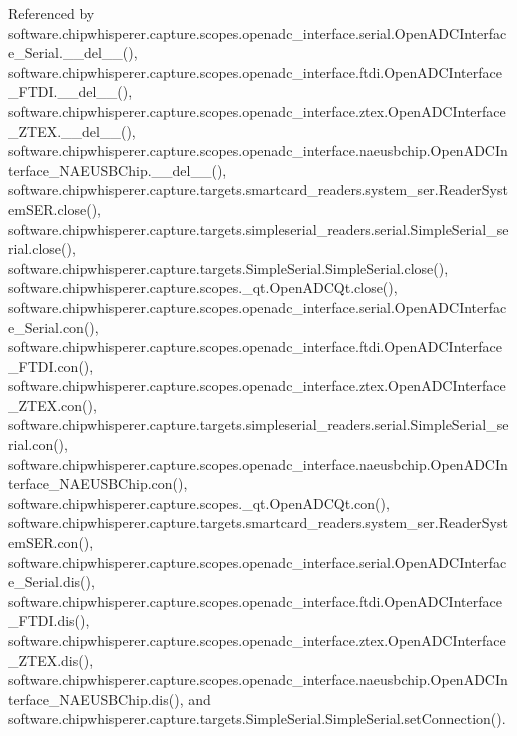 Referenced by software.\+chipwhisperer.\+capture.\+scopes.\+openadc\+\_\+interface.\+serial.\+Open\+A\+D\+C\+Interface\+\_\+\+Serial.\+\_\+\+\_\+del\+\_\+\+\_\+(), software.\+chipwhisperer.\+capture.\+scopes.\+openadc\+\_\+interface.\+ftdi.\+Open\+A\+D\+C\+Interface\+\_\+\+F\+T\+D\+I.\+\_\+\+\_\+del\+\_\+\+\_\+(), software.\+chipwhisperer.\+capture.\+scopes.\+openadc\+\_\+interface.\+ztex.\+Open\+A\+D\+C\+Interface\+\_\+\+Z\+T\+E\+X.\+\_\+\+\_\+del\+\_\+\+\_\+(), software.\+chipwhisperer.\+capture.\+scopes.\+openadc\+\_\+interface.\+naeusbchip.\+Open\+A\+D\+C\+Interface\+\_\+\+N\+A\+E\+U\+S\+B\+Chip.\+\_\+\+\_\+del\+\_\+\+\_\+(), software.\+chipwhisperer.\+capture.\+targets.\+smartcard\+\_\+readers.\+system\+\_\+ser.\+Reader\+System\+S\+E\+R.\+close(), software.\+chipwhisperer.\+capture.\+targets.\+simpleserial\+\_\+readers.\+serial.\+Simple\+Serial\+\_\+serial.\+close(), software.\+chipwhisperer.\+capture.\+targets.\+Simple\+Serial.\+Simple\+Serial.\+close(), software.\+chipwhisperer.\+capture.\+scopes.\+\_\+qt.\+Open\+A\+D\+C\+Qt.\+close(), software.\+chipwhisperer.\+capture.\+scopes.\+openadc\+\_\+interface.\+serial.\+Open\+A\+D\+C\+Interface\+\_\+\+Serial.\+con(), software.\+chipwhisperer.\+capture.\+scopes.\+openadc\+\_\+interface.\+ftdi.\+Open\+A\+D\+C\+Interface\+\_\+\+F\+T\+D\+I.\+con(), software.\+chipwhisperer.\+capture.\+scopes.\+openadc\+\_\+interface.\+ztex.\+Open\+A\+D\+C\+Interface\+\_\+\+Z\+T\+E\+X.\+con(), software.\+chipwhisperer.\+capture.\+targets.\+simpleserial\+\_\+readers.\+serial.\+Simple\+Serial\+\_\+serial.\+con(), software.\+chipwhisperer.\+capture.\+scopes.\+openadc\+\_\+interface.\+naeusbchip.\+Open\+A\+D\+C\+Interface\+\_\+\+N\+A\+E\+U\+S\+B\+Chip.\+con(), software.\+chipwhisperer.\+capture.\+scopes.\+\_\+qt.\+Open\+A\+D\+C\+Qt.\+con(), software.\+chipwhisperer.\+capture.\+targets.\+smartcard\+\_\+readers.\+system\+\_\+ser.\+Reader\+System\+S\+E\+R.\+con(), software.\+chipwhisperer.\+capture.\+scopes.\+openadc\+\_\+interface.\+serial.\+Open\+A\+D\+C\+Interface\+\_\+\+Serial.\+dis(), software.\+chipwhisperer.\+capture.\+scopes.\+openadc\+\_\+interface.\+ftdi.\+Open\+A\+D\+C\+Interface\+\_\+\+F\+T\+D\+I.\+dis(), software.\+chipwhisperer.\+capture.\+scopes.\+openadc\+\_\+interface.\+ztex.\+Open\+A\+D\+C\+Interface\+\_\+\+Z\+T\+E\+X.\+dis(), software.\+chipwhisperer.\+capture.\+scopes.\+openadc\+\_\+interface.\+naeusbchip.\+Open\+A\+D\+C\+Interface\+\_\+\+N\+A\+E\+U\+S\+B\+Chip.\+dis(), and software.\+chipwhisperer.\+capture.\+targets.\+Simple\+Serial.\+Simple\+Serial.\+set\+Connection().

